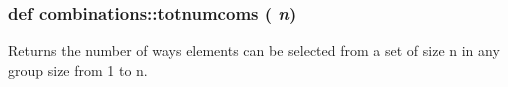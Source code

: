  \hypertarget{namespacecombinations_abefb44c848756b98f722e3fa81efda7d}{
\subsubsection[{totnumcoms}]{\setlength{\rightskip}{0pt plus 5cm}def combinations::totnumcoms ( {\em n})}}
\label{d7/d2b/namespacecombinations_abefb44c848756b98f722e3fa81efda7d}
\begin{DoxyVerb}Returns the number of ways elements can be selected from a set of size n
in any group size from 1 to n. \end{DoxyVerb}
 